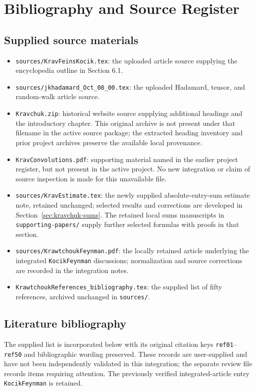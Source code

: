 \documentclass[11pt,oneside]{amsbook}
\theoremstyle{definition}
\theoremstyle{remark}
\begin{document}
\chapter*{Bibliography and Source Register}
\section*{Supplied source materials}
\begin{itemize}
\item \texttt{sources/KravFeinsKocik.tex}: the uploaded article source supplying the encyclopedia outline in Section 6.1.
\item \texttt{sources/jkhadamard\_Oct\_08\_00.tex}: the uploaded Hadamard, tensor, and random-walk article source.
\item \texttt{Kravchuk.zip}: historical website source supplying additional headings and the introductory chapter. This original archive is not present under that filename in the active source package; the extracted heading inventory and prior project archives preserve the available local provenance.
\item \texttt{KravConvolutions.pdf}: supporting material named in the earlier project register, but not present in the active project. No new integration or claim of source inspection is made for this unavailable file.
\item \texttt{sources/KravEstimate.tex}: the newly supplied absolute-entry-sum estimate note, retained unchanged; selected results and corrections are developed in Section~\ref{sec:kravchuk-sums}. The retained local sums manuscripts in \texttt{supporting-papers/} supply further selected formulas with proofs in that section.
\item \texttt{sources/KrawtchoukFeynman.pdf}: the locally retained article underlying the integrated \texttt{KocikFeynman} discussions; normalization and source corrections are recorded in the integration notes.
\item \texttt{KrawtchoukReferences\_bibliography.tex}: the supplied list of fifty references, archived unchanged in \texttt{sources/}.
\end{itemize}


\section*{Literature bibliography}
The supplied list is incorporated below with its original citation keys
\texttt{ref01}--\texttt{ref50} and bibliographic wording preserved.
These records are user-supplied and have not been independently
validated in this integration; the separate review file records items
requiring attention. The previously verified integrated-article entry
\texttt{KocikFeynman} is retained.

\end{document}

